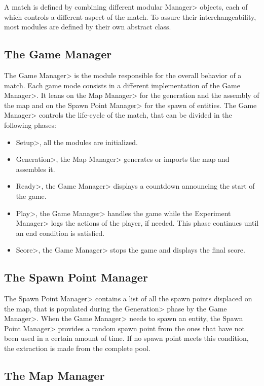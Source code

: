 \par

A match is defined by combining different modular \<Manager> objects, each of which controls a different aspect of the match. To assure their interchangeability, most modules are defined by their own abstract class.

\subsection{The Game Manager}

The \<Game Manager> is the module responsible for the overall behavior of a match. Each game mode consists in a different implementation of the \<Game Manager>. It leans on the \<Map Manager> for the generation and the assembly of the map and on the \<Spawn Point Manager> for the spawn of entities. The \<Game Manager> controls the life-cycle of the match, that can be divided in the following phases:

\begin{itemize}
\item \<Setup>, all the modules are initialized.
\item \<Generation>, the \<Map Manager> generates or imports the map and assembles it.
\item \<Ready>, the \<Game Manager> displays a countdown announcing the start of the game.
\item \<Play>, the \<Game Manager> handles the game while the \<Experiment Manager> logs the actions of the player, if needed. This phase continues until an end condition is satisfied.
\item \<Score>, the \<Game Manager> stops the game and displays the final score.
\end{itemize}

\subsection{The Spawn Point Manager}

The \<Spawn Point Manager> contains a list of all the spawn points displaced on the map, that is populated during the \<Generation> phase by the \<Game Manager>. When the \<Game Manager> needs to spawn an entity, the \<Spawn Point Manager> provides a random spawn point from the ones that have not been used in a certain amount of time. If no spawn point meets this condition, the extraction is made from the complete pool.

\subsection{The Map Manager}


